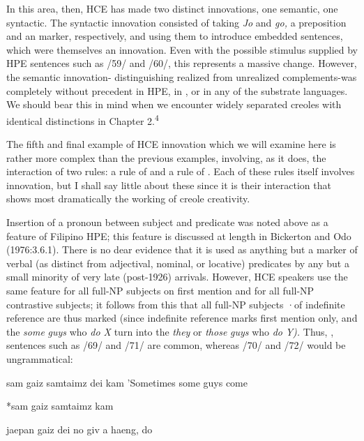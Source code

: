 In this area, then, HCE has made two distinct innovations, one semantic, one syntactic. The syntactic innovation consisted of taking \textit{Jo} and \textit{go,} a preposition and an  marker, respectively, and using them to introduce embedded sentences, which were themselves an innovation. Even with the possible stimulus supplied by HPE sen\-tences such as /59/ and /60/, this represents a massive change. However, the semantic innovation- distinguishing realized from unrealized com\-plements-was completely without precedent in HPE, in , or in any of the substrate languages. We should bear this in mind when we encounter widely separated creoles with identical distinctions in Chapter 2.\textsuperscript{4}

The fifth and final example of HCE innovation which we will examine here is rather more complex than the previous examples, involving, as it does, the interaction of two rules: a rule of  and a rule of . Each of these rules itself involves inno\-vation, but I shall say little about these since it is their interaction that shows most dramatically the working of creole creativity.

  


 


Insertion of a pronoun between subject and predicate was noted above as a feature of Filipino HPE; this feature is discussed at length in Bickerton and Odo (1976:3.6.1). There is no dear evidence that it is used as anything but a marker of verbal (as distinct from adjectival, nominal, or locative) predicates by any but a small minority of very late (post-1926) arrivals. However, HCE speakers use the same feature for all full-NP subjects on first mention and for all full-NP contrastive subjects; it follows from this that all full-NP subjects ·of indefinite refer\-ence are thus marked (since indefinite reference marks first mention only, and the \textit{some} \textit{guys} who \textit{do X }turn into the \textit{they} or \textit{those} \textit{guys }who \textit{do} \textit{Y}\textit{).} Thus, , sentences such as /69/ and /71/ are common, whereas /70/ and /72/ would be ungrammatical:

\ea\label{ex:69}
 sam gaiz samtaimz dei kam 'Sometimes some guys come
\glt
\z

\ea\label{ex:70}
 *sam gaiz samtaimz kam
\glt
\z

\ea\label{ex:71}
 jaepan gaiz dei no giv a haeng, do
\glt
\z

